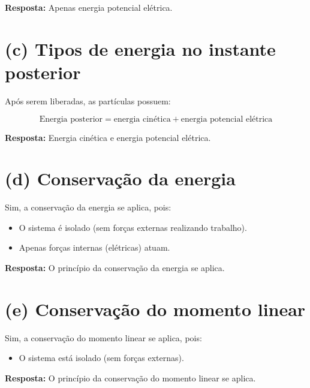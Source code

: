 \documentclass[a4paper,12pt]{article}
\begin{document}
\begin{flushleft}
\colorbox{green!20}{\textbf{Resposta:} Apenas energia potencial elétrica.}

\section*{(c) Tipos de energia no instante posterior}

Após serem liberadas, as partículas possuem:

\begin{equation}
\text{Energia posterior} = \text{energia cinética} + \text{energia potencial elétrica}
\end{equation}

\colorbox{green!20}{\textbf{Resposta:} Energia cinética e energia potencial elétrica.}

\section*{(d) Conservação da energia}

Sim, a conservação da energia se aplica, pois:

\begin{itemize}
    \item O sistema é isolado (sem forças externas realizando trabalho).
    \item Apenas forças internas (elétricas) atuam.
\end{itemize}

\colorbox{green!20}{\textbf{Resposta:} O princípio da conservação da energia se aplica.}

\section*{(e) Conservação do momento linear}

Sim, a conservação do momento linear se aplica, pois:

\begin{itemize}
    \item O sistema está isolado (sem forças externas).
\end{itemize}

\colorbox{green!20}{\textbf{Resposta:} O princípio da conservação do momento linear se aplica.}
\end{flushleft}
\end{document}
